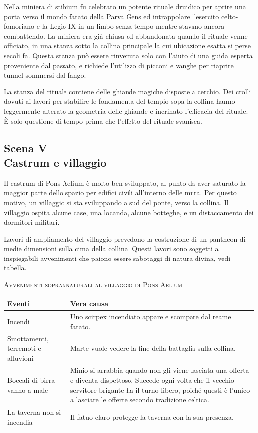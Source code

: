\documentclass[11.5pt,twocolumn]{article}
\begin{document}
Nella miniera di stibium fu celebrato un potente rituale druidico per aprire una porta verso il mondo fatato della Parva Gens ed intrappolare l'esercito celto-fomoriano e la Legio IX in un limbo senza tempo mentre stavano ancora combattendo.
La miniera era gi\`{a} chiusa ed abbandonata quando il rituale venne officiato, in una stanza sotto la collina principale la cui ubicazione esatta si perse secoli fa.
Questa stanza pu\`{o} essere rinvenuta solo con l'aiuto di una guida esperta proveniente dal passato, e richiede l'utilizzo di picconi e vanghe per riaprire tunnel sommersi dal fango.

La stanza del rituale contiene delle ghiande magiche disposte a cerchio.
Dei crolli dovuti ai lavori per stabilire le fondamenta del tempio sopa la collina hanno leggermente alterato la geometria delle ghiande e incrinato l'efficacia del rituale.
\`{E} solo questione di tempo prima che l'effetto del rituale svanisca.

\subsection*{Scena V\\Castrum e villaggio}
%
Il castrum di Pons Aelium \`{e} molto ben sviluppato, al punto da aver saturato la maggior parte dello spazio per edifici civili all'interno delle mura.
Per questo motivo, un villaggio si sta sviluppando a sud del ponte, verso la collina.
Il villaggio ospita alcune case, una locanda, alcune botteghe, e un distaccamento dei dormitori militari.

Lavori di ampliamento del villaggio prevedono la costruzione di un pantheon di medie dimensioni sulla cima della collina.
Questi lavori sono soggetti a inspiegabili avvenimenti che paiono essere sabotaggi di natura divina, vedi tabella.

\begin{table}[tb]
\begin{infobox}
\begin{center}
\textsc{Avvenimenti soprannaturali al villaggio di Pons Aelium}
\vspace{1em}
\end{center}
\begin{tabular}{| m{} m{} |}
\hline
\textbf{Eventi} & \textbf{Vera causa} \\
\hline
Incendi &
Uno scirpex incendiato appare e scompare dal reame fatato.
\\
\hline
Smottamenti, terremoti e alluvioni &
Marte vuole vedere la fine della battaglia sulla collina.
\\
\hline
Boccali di birra vanno a male &
Minio si arrabbia quando non gli viene lasciata una offerta e diventa dispettoso.
Succede ogni volta che il vecchio servitore brigante ha il turno libero, poich\'{e} questi \`{e} l'unico a lasciare le offerte secondo tradizione celtica.
\\
\hline
La taverna non si incendia &
Il fatuo claro protegge la taverna con la sua presenza.
\\
\hline
\end{tabular}
\end{infobox}
\end{table}
\end{document}
